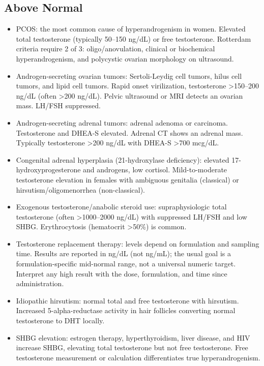 \subsection*{Above Normal}
\begin{itemize}
  \item PCOS: the most common cause of hyperandrogenism in women. Elevated total testosterone (typically 50--150 ng/dL) or free testosterone. Rotterdam criteria require 2 of 3: oligo/anovulation, clinical or biochemical hyperandrogenism, and polycystic ovarian morphology on ultrasound.
  \item Androgen-secreting ovarian tumors: Sertoli-Leydig cell tumors, hilus cell tumors, and lipid cell tumors. Rapid onset virilization, testosterone >150--200 ng/dL (often >200 ng/dL). Pelvic ultrasound or MRI detects an ovarian mass. LH/FSH suppressed.
  \item Androgen-secreting adrenal tumors: adrenal adenoma or carcinoma. Testosterone and DHEA-S elevated. Adrenal CT shows an adrenal mass. Typically testosterone >200 ng/dL with DHEA-S >700 mcg/dL.
  \item Congenital adrenal hyperplasia (21-hydroxylase deficiency): elevated 17-hydroxyprogesterone and androgens, low cortisol. Mild-to-moderate testosterone elevation in females with ambiguous genitalia (classical) or hirsutism/oligomenorrhea (non-classical).
  \item Exogenous testosterone/anabolic steroid use: supraphysiologic total testosterone (often >1000--2000 ng/dL) with suppressed LH/FSH and low SHBG. Erythrocytosis (hematocrit >50\%) is common.
  \item Testosterone replacement therapy: levels depend on formulation and sampling time. Results are reported in ng/dL (not ng/mL); the usual goal is a formulation-specific mid-normal range, not a universal numeric target. Interpret any high result with the dose, formulation, and time since administration.
  \item Idiopathic hirsutism: normal total and free testosterone with hirsutism. Increased 5-alpha-reductase activity in hair follicles converting normal testosterone to DHT locally.
  \item SHBG elevation: estrogen therapy, hyperthyroidism, liver disease, and HIV increase SHBG, elevating total testosterone but not free testosterone. Free testosterone measurement or calculation differentiates true hyperandrogenism.
\end{itemize}

